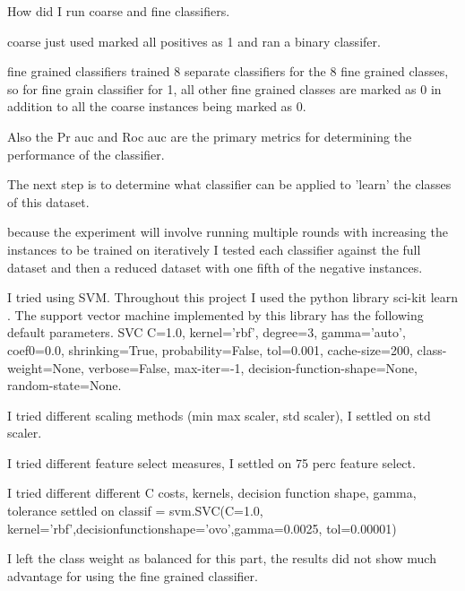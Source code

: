 \documentclass[ms]{nuthesis}
\begin{document}
\par How did I run coarse and fine classifiers.
\par coarse just used marked all positives as 1 and ran a binary classifer.
\par fine grained classifiers trained 8 separate classifiers for the 8 fine grained
classes, so for fine grain classifier for 1, all other fine grained classes are marked as 0
in addition to all the coarse instances being marked as 0.
\par Also the Pr auc and Roc auc are the primary metrics for determining the performance
of the classifier.

\par The next step is to determine what classifier can be applied to 'learn' the classes of
this dataset.
\par because the experiment will involve running multiple rounds with increasing the instances to
 be trained on iteratively I tested each classifier against the full dataset and then a reduced
 dataset with one fifth of the negative instances.



\par I tried using SVM. Throughout this project I used the python library sci-kit learn \cite{scikit-learn}.
The support vector machine implemented by this library has the following default parameters. SVC C=1.0,
kernel='rbf', degree=3, gamma='auto', coef0=0.0, shrinking=True, probability=False, tol=0.001, cache-size=200,
class-weight=None, verbose=False, max-iter=-1, decision-function-shape=None, random-state=None.

\par I tried different scaling methods (min max scaler, std scaler), I settled on std scaler.



\par I tried different feature select measures, I settled on 75 perc feature select.



\par I tried different different C costs, kernels, decision function shape, gamma, tolerance
settled on classif = svm.SVC(C=1.0, kernel='rbf',decisionfunctionshape='ovo',gamma=0.0025,
 tol=0.00001)



\par I left the class weight as balanced for this part, the results did not show much advantage
for using the fine grained classifier.
\end{document}
